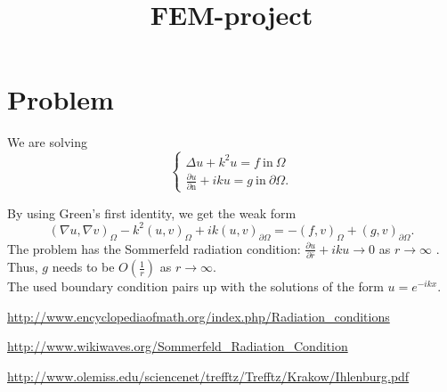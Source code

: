 \documentclass[a4paper,12pt]{article}
\begin{document}
\title{FEM-project}
\author{}
\date{}
\maketitle
\section*{Problem}
We are solving \[ \begin{cases}
\Delta u + k^2 u = f \ \mathrm{in} \ \Omega \\ \frac{\partial u}{\partial \mathrm{n}} + iku = g \ \mathrm{in} \ \partial \Omega.
\end{cases} \]

By using Green's first identity, we get the weak form \begin{equation*}
(\nabla u, \nabla v)_{\Omega} - k^2(u, v)_{\Omega} + ik(u, v)_{\partial \Omega} = -(f, v)_{\Omega} + (g, v)_{\partial \Omega}.
\end{equation*} The problem has the Sommerfeld radiation condition: $\frac{\partial u}{\partial \bar{r}} + iku \rightarrow 0$ as $r \rightarrow \infty$ \cite{eom} \cite{wikiwaves}. Thus, $g$ needs to be $O(\frac{1}{r})$ as $r \rightarrow \infty$.
\\

The used boundary condition pairs up with the solutions of the form $u = e^{-ikx}$. 

\begin{thebibliography}{9}

\url{http://www.encyclopediaofmath.org/index.php/Radiation_conditions}

\url{http://www.wikiwaves.org/Sommerfeld_Radiation_Condition}

\url{http://www.olemiss.edu/sciencenet/trefftz/Trefftz/Krakow/Ihlenburg.pdf}

\end{thebibliography}
\end{document}
